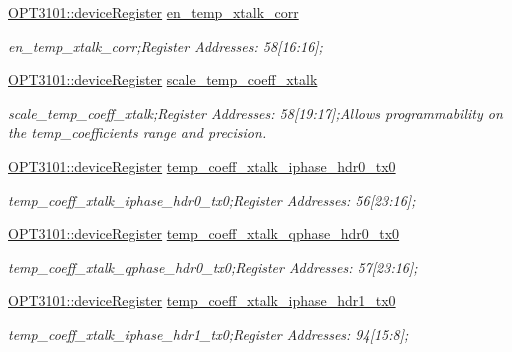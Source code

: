 \begin{DoxyCompactItemize}
\mbox{\hyperlink{class_o_p_t3101_1_1device_register}{O\+P\+T3101\+::device\+Register}} \mbox{\hyperlink{class_o_p_t3101_1_1registers_a5fa5b3119e4fa416a86a3ed22090c1c3}{en\+\_\+temp\+\_\+xtalk\+\_\+corr}}
\begin{DoxyCompactList}\small\item\em en\+\_\+temp\+\_\+xtalk\+\_\+corr;Register Addresses\+: 58\mbox{[}16\+:16\mbox{]}; \end{DoxyCompactList}\item 
\mbox{\hyperlink{class_o_p_t3101_1_1device_register}{O\+P\+T3101\+::device\+Register}} \mbox{\hyperlink{class_o_p_t3101_1_1registers_a056d6a7717acab1d8915fc3977c0d130}{scale\+\_\+temp\+\_\+coeff\+\_\+xtalk}}
\begin{DoxyCompactList}\small\item\em scale\+\_\+temp\+\_\+coeff\+\_\+xtalk;Register Addresses\+: 58\mbox{[}19\+:17\mbox{]};Allows programmability on the temp\+\_\+coefficients range and precision. \end{DoxyCompactList}\item 
\mbox{\hyperlink{class_o_p_t3101_1_1device_register}{O\+P\+T3101\+::device\+Register}} \mbox{\hyperlink{class_o_p_t3101_1_1registers_aa50f56c0dff1f2313613badd2e6fc79c}{temp\+\_\+coeff\+\_\+xtalk\+\_\+iphase\+\_\+hdr0\+\_\+tx0}}
\begin{DoxyCompactList}\small\item\em temp\+\_\+coeff\+\_\+xtalk\+\_\+iphase\+\_\+hdr0\+\_\+tx0;Register Addresses\+: 56\mbox{[}23\+:16\mbox{]}; \end{DoxyCompactList}\item 
\mbox{\hyperlink{class_o_p_t3101_1_1device_register}{O\+P\+T3101\+::device\+Register}} \mbox{\hyperlink{class_o_p_t3101_1_1registers_a89fdd9ab86cb15957795111bcf351329}{temp\+\_\+coeff\+\_\+xtalk\+\_\+qphase\+\_\+hdr0\+\_\+tx0}}
\begin{DoxyCompactList}\small\item\em temp\+\_\+coeff\+\_\+xtalk\+\_\+qphase\+\_\+hdr0\+\_\+tx0;Register Addresses\+: 57\mbox{[}23\+:16\mbox{]}; \end{DoxyCompactList}\item 
\mbox{\hyperlink{class_o_p_t3101_1_1device_register}{O\+P\+T3101\+::device\+Register}} \mbox{\hyperlink{class_o_p_t3101_1_1registers_a4bb62ec5e255c1e55d840526c7708628}{temp\+\_\+coeff\+\_\+xtalk\+\_\+iphase\+\_\+hdr1\+\_\+tx0}}
\begin{DoxyCompactList}\small\item\em temp\+\_\+coeff\+\_\+xtalk\+\_\+iphase\+\_\+hdr1\+\_\+tx0;Register Addresses\+: 94\mbox{[}15\+:8\mbox{]}; \end{DoxyCompactList}\item 

\end{DoxyCompactItemize}
